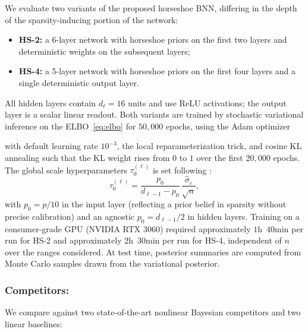 We evaluate two variants of the proposed horseshoe BNN, differing in the depth of the sparsity-inducing portion of the network:
\begin{itemize}
  \item \textbf{HS-2:} a 6-layer network with horseshoe priors on the
    first two layers and deterministic weights on the subsequent layers;
  \item \textbf{HS-4:} a 5-layer network with horseshoe priors on the
    first four layers and a single deterministic output layer.
\end{itemize}
All hidden layers contain $d_\ell = 16$ units and use ReLU
activations; the output layer is a scalar linear readout.  Both
variants are trained by stochastic variational inference on the
ELBO~\eqref{eq:elbo} for $50{,}000$ epochs, using the Adam optimizer
{\citep{kingma_adam_2014} with default learning rate
$10^{-3}$, the local reparameterization trick, and cosine KL
annealing such that the KL weight rises from $0$ to $1$ over the
first $20{,}000$ epochs.  The global
scale hyperparameters $\tau_0^{(\ell)}$ is set following
\citet{piironen_hyperprior_2017}:
\begin{equation}
  \tau_0^{(\ell)}
  = \frac{p_0}{d_{\ell-1} - p_0}\,\frac{\hat{\sigma}_\varepsilon}{\sqrt{n}},
  \label{eq:ch3-tau0}
\end{equation}
with $p_0 = p/10$ in the input layer (reflecting a prior belief in
sparsity without precise calibration) and an agnostic $p_0 = d_{\ell-1}/2$ in
hidden layers.  Training on a consumer-grade GPU (NVIDIA RTX 3060) required approximately $1$h~$40$min per run for HS-2 and
approximately $2$h~$30$min per run for HS-4, independent
of $n$ over the ranges considered.  At test time, posterior
summaries are computed from Monte Carlo samples drawn from
the variational posterior.

\subsubsection*{Competitors:}

We compare against two state-of-the-art nonlinear Bayesian
competitors and two linear baselines:

}
